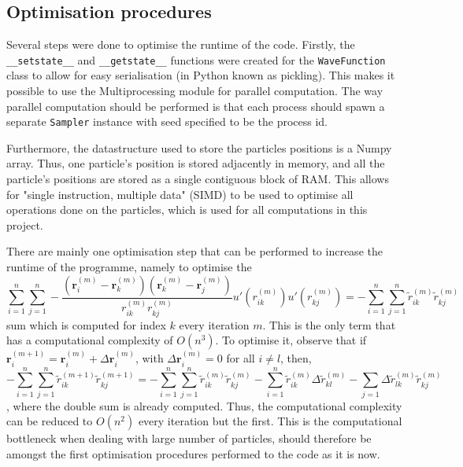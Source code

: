 \documentclass[11pt,a4paper]{article}
\numberwithin{equation}{section}
\begin{document}
\subsection{Optimisation procedures}
Several steps were done to optimise the runtime of the code. Firstly, the \texttt{\_\_setstate\_\_} and \texttt{\_\_getstate\_\_} functions were created for the \texttt{WaveFunction} class to allow for easy serialisation (in Python known as pickling). This makes it possible to use the Multiprocessing module for parallel computation. The way parallel computation should be performed is that each process should spawn a separate \texttt{Sampler} instance with seed specified to be the process id.

Furthermore, the datastructure used to store the particles positions is a Numpy array. Thus, one particle's position is stored adjacently in memory, and all the particle's positions are stored as a single contiguous block of RAM. This allows for "single instruction, multiple data" (SIMD) to be used to optimise all operations done on the particles, which is used for all computations in this project.

There are mainly one optimisation step that can be performed to increase the runtime of the programme, namely to optimise the 
\begin{equation}
    \sum_{i=1}^n \sum_{j=1}^n -\frac{(\bm{r}_i^{(m)} - \bm{r}_k^{(m)})(\bm{r}_k^{(m)} - \bm{r}_j^{(m)})}{r_{ik}^{(m)}r_{kj}^{(m)}}u'(r_{ik}^{(m)})u'(r_{kj}^{(m)}) = -\sum_{i=1}^n \sum_{j=1}^n \tilde{r}_{ik}^{(m)}\tilde{r}_{kj}^{(m)}
\end{equation}
sum which is computed for index $k$ every iteration $m$. This is the only term that has a computational complexity of $O(n^3)$. To optimise it, observe that if $\bm{r}_i^{(m+1)} = \bm{r}_i^{(m)} + \Delta \bm{r}_i^{(m)}$, with $\Delta \bm{r}_i^(m) = 0$ for all $i \neq l$, then,
\begin{equation}
    -\sum_{i=1}^n \sum_{j=1}^n \tilde{r}_{ik}^{(m+1)}\tilde{r}_{kj}^{(m+1)} = -\sum_{i=1}^n \sum_{j=1}^n \tilde{r}_{ik}^{(m)}\tilde{r}_{kj}^{(m)} -\sum_{i=1}^n \tilde{r}_{ik}^{(m)} \Delta \tilde{r}_{kl}^{(m)} - \sum_{j=1} \Delta \tilde{r}_{lk}^{(m)} \tilde{r}_{kj}^{(m)}
\end{equation},
where the double sum is already computed. Thus, the computational complexity can be reduced to $O(n^2)$ every iteration but the first. This is the computational bottleneck when dealing with large number of particles, should therefore be amongst the first optimisation procedures performed to the code as it is now.
\end{document}
